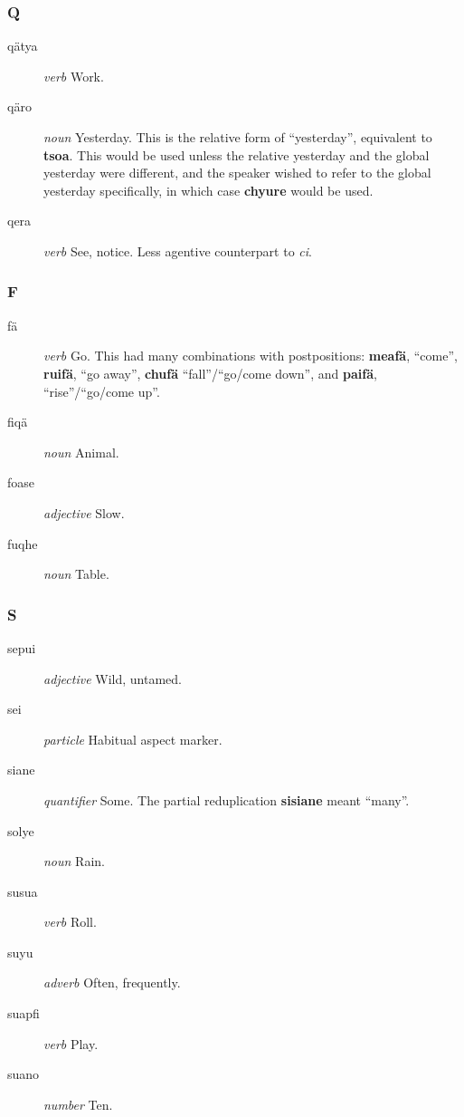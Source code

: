 \documentclass{article}
\begin{document}
\subsubsection{Q}

\begin{description}
\item [q\"atya] \emph{verb} Work.
\item [q\"aro] \emph{noun} Yesterday.  This is the relative form of ``yesterday'', equivalent to \textbf{tsoa}.  This would be used unless the relative yesterday and the global yesterday were different, and the speaker wished to refer to the global yesterday specifically, in which case \textbf{chyure} would be used.
\item [qera] \emph{verb} See, notice.  Less agentive counterpart to \emph{ci}.
\end{description}

\subsubsection{F}

\begin{description}
\item [f\"a] \emph{verb} Go.  This had many combinations with postpositions: \textbf{meaf\"a}, ``come'', \textbf{ruif\"a}, ``go away'', \textbf{chuf\"a} ``fall''/``go/come down'', and \textbf{paif\"a}, ``rise''/``go/come up''.
\item [fiq\"a] \emph{noun} Animal.
\item [foase] \emph{adjective} Slow.
\item [fuqhe] \emph{noun} Table.
\end{description}

\subsubsection{S}

\begin{description}
\item [sepui] \emph{adjective} Wild, untamed.
\item [sei] \emph{particle} Habitual aspect marker.
\item [siane] \emph{quantifier} Some.  The partial reduplication \textbf{sisiane} meant ``many''.
\item [solye] \emph{noun} Rain.
\item [susua] \emph{verb} Roll.
\item [suyu] \emph{adverb} Often, frequently.
\item [suapfi] \emph{verb} Play.
\item [suano] \emph{number} Ten.
\end{description}
\end{document}
